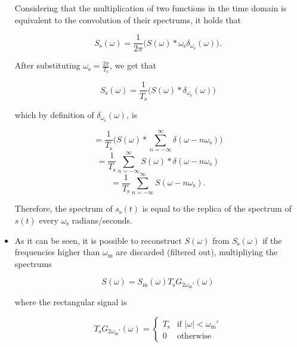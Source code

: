 \begin{itemize}
  Considering that the multiplication of two functions in the time domain is equivalent to the convolution of their spectrums, it holds that

  \begin{equation}
    S_\text{s}(\omega) = \frac{1}{2\pi}\big(S(\omega)*\omega_\text{s}\delta_{\omega_\text{s}}(\omega)\big).
  \end{equation}

  After substituting $\omega_\text{s}=\frac{2\pi}{T_\text{s}}$, we get that

  \begin{equation}
    S_\text{s}(\omega) = \frac{1}{T_\text{s}}\big(S(\omega)*\delta_{\omega_\text{s}}(\omega)\big)
  \end{equation}

  which by definition of $\delta_{\omega_\text{s}}(\omega)$, is

  \begin{equation}
    = \frac{1}{T_\text{s}}\big(S(\omega)*\sum_{n=-\infty}^{\infty}\delta(\omega-n\omega_\text{s})\big)
  \end{equation}
  \begin{equation}
    = \frac{1}{T_\text{s}}\sum_{n=-\infty}^{\infty}S(\omega)*\delta(\omega-n\omega_\text{s})
  \end{equation}
  \begin{equation}
    = \frac{1}{T_\text{s}}\sum_{n=-\infty}^{\infty}S(\omega-n\omega_\text{s}).
  \end{equation}

  Therefore, the spectrum of $s_\text{s}(t)$ is equal to the replica  of the spectrum of $s(t)$ every $\omega_\text{s}$ radians/seconds.


\item As it can be seen, it is possible to reconstruct $S(\omega)$ from $S_\text{s}(\omega)$ if the frequencies higher than $\omega_\text{m}$ are discarded (filtered out), multipliying the spectrums

  \begin{equation}
    S(\omega) = S_\text{m}(\omega)T_\text{s}G_{2\omega_\text{m}'}(\omega)
  \end{equation}

  where the rectangular signal is

  \begin{equation}
    T_\text{s}G_{2\omega_\text{m}'}(\omega) =
    \left\{
    \begin{array}{ll}
      T_\text{s} & \text{if $|\omega| < \omega_\text{m}'$} \\
      0 & \text{otherwise}
    \end{array}
    \right.
  \end{equation}


\end{itemize}
